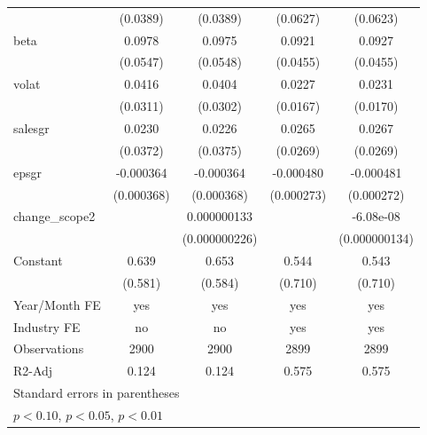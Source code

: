 \begin{table}[htbp]
\begin{tabular}{l*{4}{c}}
                    &    (0.0389)         &    (0.0389)         &    (0.0627)         &    (0.0623)         \\
[1em]
beta                &      0.0978\sym{*}  &      0.0975\sym{*}  &      0.0921\sym{**} &      0.0927\sym{**} \\
                    &    (0.0547)         &    (0.0548)         &    (0.0455)         &    (0.0455)         \\
[1em]
volat               &      0.0416         &      0.0404         &      0.0227         &      0.0231         \\
                    &    (0.0311)         &    (0.0302)         &    (0.0167)         &    (0.0170)         \\
[1em]
salesgr             &      0.0230         &      0.0226         &      0.0265         &      0.0267         \\
                    &    (0.0372)         &    (0.0375)         &    (0.0269)         &    (0.0269)         \\
[1em]
epsgr               &   -0.000364         &   -0.000364         &   -0.000480\sym{*}  &   -0.000481\sym{*}  \\
                    &  (0.000368)         &  (0.000368)         &  (0.000273)         &  (0.000272)         \\
[1em]
change\_scope2       &                     & 0.000000133         &                     &   -6.08e-08         \\
                    &                     &(0.000000226)         &                     &(0.000000134)         \\
[1em]
Constant            &       0.639         &       0.653         &       0.544         &       0.543         \\
                    &     (0.581)         &     (0.584)         &     (0.710)         &     (0.710)         \\
\hline
Year/Month FE       &         yes         &         yes         &         yes         &         yes         \\
Industry FE         &          no         &          no         &         yes         &         yes         \\
Observations        &        2900         &        2900         &        2899         &        2899         \\
R2-Adj              &       0.124         &       0.124         &       0.575         &       0.575         \\
\hline\hline
\multicolumn{5}{l}{\footnotesize Standard errors in parentheses}\\
\multicolumn{5}{l}{\footnotesize \sym{*} \(p<0.10\), \sym{**} \(p<0.05\), \sym{***} \(p<0.01\)}\\
\end{tabular}
\end{table}
